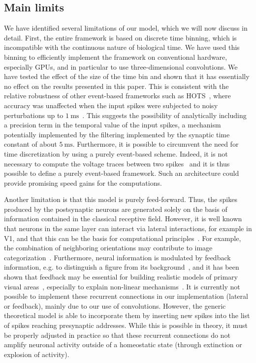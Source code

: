 \documentclass[runningheads]{llncs}
\newcommand{\ms}{\si{\milli\second}}%
\begin{document}
\subsection{Main limits}
We have identified several limitations of our model, which we will now discuss in detail. First, the entire framework is based on discrete time binning, which is incompatible with the continuous nature of biological time. We have used this binning to efficiently implement the framework on conventional hardware, especially GPUs, and in particular to use three-dimensional convolutions. We have tested the effect of the size of the time bin and shown that it has essentially no effect on the results presented in this paper. This is consistent with the relative robustness of other event-based frameworks such as HOTS~\cite{lagorce_hots_2017}, where accuracy was unaffected when the input spikes were subjected to noisy perturbations up to $1~\ms$~\cite{grimaldi_robust_2022}. This suggests the possibility of analytically including a precision term in the temporal value of the input spikes, a mechanism potentially implemented by the filtering implemented by the synaptic time constant of about $5~\ms$. Furthermore, it is possible to circumvent the need for time discretization by using a purely event-based scheme. Indeed, it is not necessary to compute the voltage traces between two spikes~\cite{hanuschkin_general_2010} and it is thus possible to define a purely event-based framework. Such an architecture could provide promising speed gains for the computations.

Another limitation is that this model is purely feed-forward. Thus, the spikes produced by the postsynaptic neurons are generated solely on the basis of information contained in the classical receptive field. However, it is well known that neurons in the same layer can interact via lateral interactions, for example in V1, and that this can be the basis for computational principles~\cite{chavane_revisiting_2022}. For example, the combination of neighboring orientations may contribute to image categorization~\cite{perrinet_edge_2015}. Furthermore, neural information is modulated by feedback information, e.g. to distinguish a figure from its background~\cite{roelfsema_early_2016}, and it has been shown that feedback may be essential for building realistic models of primary visual areas~\cite{boutin_sparse_2020,boutin_effect_2020}, especially to explain non-linear mechanisms~\cite{boutin_pooling_2022}. It is currently not possible to implement these recurrent connections in our implementation (lateral or feedback), mainly due to our use of convolutions. However, the generic theoretical model is able to incorporate them by inserting new spikes into the list of spikes reaching presynaptic addresses. While this is possible in theory, it must be properly adjusted in practice so that these recurrent connections do not amplify neuronal activity outside of a homeostatic state (through extinction or explosion of activity).  
\end{document}
